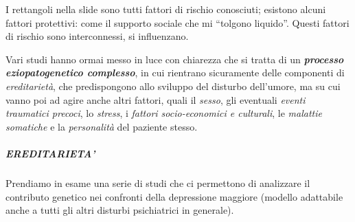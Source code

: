I rettangoli nella slide sono tutti fattori di rischio conosciuti;
esistono alcuni fattori protettivi: come il supporto sociale che mi
``tolgono liquido''. Questi fattori di rischio sono interconnessi, si
influenzano.

Vari studi hanno ormai messo in luce con chiarezza che si tratta di un
\textbf{\emph{processo eziopatogenetico complesso}}, in cui rientrano
sicuramente delle componenti di \emph{ereditarietà}, che predispongono
allo sviluppo del disturbo dell'umore, ma su cui vanno poi ad agire
anche altri fattori, quali il \emph{sesso}, gli eventuali \emph{eventi
traumatici precoci}, lo \emph{stress}, i \emph{fattori socio-economici e
culturali}, le \emph{malattie somatiche} e la \emph{personalità} del
paziente stesso.

\subparagraph{EREDITARIETA'}

Prendiamo in esame una serie di studi che ci permettono di analizzare il
contributo genetico nei confronti della depressione maggiore (modello
adattabile anche a tutti gli altri disturbi psichiatrici in generale).

